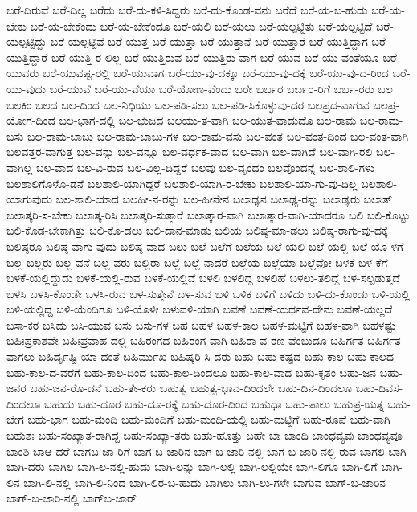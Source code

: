 ಬರೆ-ದಿರುವೆ
ಬರೆ-ದಿಲ್ಲ
ಬರೆದು
ಬರೆ-ದು-ಕಳಿ-ಸಿದ್ದರು
ಬರೆ-ದು-ಕೊಂಡ-ವನು
ಬರೆದೆ
ಬರೆ-ಯ-ಬ-ಹುದು
ಬರೆ-ಯ-ಬೇಕು
ಬರೆ-ಯ-ಬೇಕೆಂದು
ಬರೆ-ಯ-ಬೇಕೆಂದೂ
ಬರೆ-ಯಲಿ
ಬರೆ-ಯಲು
ಬರೆ-ಯಲ್ಪಟ್ಟಿತು
ಬರೆ-ಯಲ್ಪಟ್ಟಿದೆ
ಬರೆ-ಯಲ್ಪಟ್ಟಿದ್ದು
ಬರೆ-ಯಲ್ಪಟ್ಟಿವೆ
ಬರೆ-ಯುತ್ತ
ಬರೆ-ಯುತ್ತಾ
ಬರೆ-ಯುತ್ತಾನೆ
ಬರೆ-ಯುತ್ತಾರೆ
ಬರೆ-ಯುತ್ತಿದ್ದಾಗ
ಬರೆ-ಯುತ್ತಿದ್ದಾರೆ
ಬರೆ-ಯುತ್ತಿ-ರ-ಲಿಲ್ಲ
ಬರೆ-ಯುತ್ತಿರುವ
ಬರೆ-ಯುತ್ತಿರು-ವಾಗ
ಬರೆ-ಯುವ
ಬರೆ-ಯು-ವಂತೆಯೂ
ಬರೆ-ಯುವರು
ಬರೆ-ಯುವಷ್ಟ-ರಲ್ಲಿ
ಬರೆ-ಯುವಾಗ
ಬರೆ-ಯು-ವು-ದಕ್ಕೂ
ಬರೆ-ಯು-ವು-ದಕ್ಕೆ
ಬರೆ-ಯು-ವು-ದ-ರಿಂದ
ಬರೆ-ಯು-ವುದು
ಬರೆ-ಯುವೆ
ಬರೆ-ಯು-ವೆಯಾ
ಬರೆ-ಯೋಣ-ವೆಂದು
ಬರೇ
ಬರ್ಬರ
ಬರ್ಬರ-ರಿಗೆ
ಬರ್ಬ-ರರು
ಬಲ
ಬಲಕಿಂ
ಬಲದ
ಬಲ-ದಿಂದ
ಬಲ-ನಿಧಿಯು
ಬಲ-ಪಡಿ-ಸಲು
ಬಲ-ಪಡಿ-ಸಿಕೊಳ್ಳುವು-ದರ
ಬಲಪ್ರದ-ವಾಗುವ
ಬಲಪ್ರ-ಯೋಗ-ದಿಂದ
ಬಲ-ಭಾಗ-ದಲ್ಲಿ
ಬಲ-ಭುಜದ
ಬಲಯು-ತ-ವಾಗಿ
ಬಲ-ಯುತ-ವಾದುದೊ
ಬಲ-ರಾಮ
ಬಲ-ರಾಮ-ಬಸು
ಬಲ-ರಾಮ-ಬಾಬು
ಬಲ-ರಾಮ-ಬಾಬು-ಗಳ
ಬಲ-ರಾಮ-ವಸು
ಬಲ-ವಂತ
ಬಲ-ವಂತ-ದಿಂದ
ಬಲ-ವಂತ-ವಾಗಿ
ಬಲವತ್ತರ-ವಾಗುತ್ತ
ಬಲ-ವನ್ನು
ಬಲ-ವನ್ನೂ
ಬಲ-ವರ್ಧಕ-ವಾದ
ಬಲ-ವಾಗಿ
ಬಲ-ವಾಗಿದೆ
ಬಲ-ವಾಗಿ-ರಲಿ
ಬಲ-ವಾಗಿಲ್ಲ
ಬಲ-ವಾದ
ಬಲ-ವಿ-ರುವ
ಬಲ-ವಿಲ್ಲ-ದಿದ್ದರೆ
ಬಲವು
ಬಲ-ವೃಂದಂ
ಬಲವೊಂದನ್ನೆ
ಬಲ-ಶಾಲಿ-ಗಳು
ಬಲಶಾಲಿಗೊಳೊ-ಡನೆ
ಬಲಶಾಲಿ-ಯಾಗಿದ್ದರೆ
ಬಲಶಾಲಿ-ಯಾಗಿ-ರ-ಬೇಕು
ಬಲಶಾಲಿ-ಯಾ-ಗು-ವು-ದಿಲ್ಲ
ಬಲಶಾಲಿ-ಯಾಗುವುದು
ಬಲ-ಶಾಲಿ-ಯಾದ
ಬಲಹೀ-ನ-ರನ್ನು
ಬಲ-ಹೀನೇನ
ಬಲಾಢ್ಯನ
ಬಲಾಢ್ಯ-ರನ್ನು
ಬಲಾಢ್ಯರು
ಬಲಾತ್
ಬಲಾತ್ಕರಿ-ಸ-ಬೇಕು
ಬಲಾತ್ಕ-ರಿಸಿ
ಬಲಾತ್ಕರಿ-ಸುತ್ತಾರೆ
ಬಲಾತ್ಕಾರ-ವಾಗಿ
ಬಲಾತ್ಕಾರ-ವಾಗಿ-ಯಾದರೂ
ಬಲಿ
ಬಲಿ-ಕೊಟ್ಟು
ಬಲಿ-ಕೊಡ-ಬೇಕಾಗಿತ್ತು
ಬಲಿ-ಕೊ-ಡಲು
ಬಲಿ-ದಾನ-ಮಾಡು
ಬಲಿಯ
ಬಲಿಷ್ಠ-ಮಾ-ಡಲು
ಬಲಿಷ್ಠ-ರಾಗು-ವು-ದಕ್ಕೆ
ಬಲಿಷ್ಠರೂ
ಬಲಿಷ್ಠ-ವಾಗು-ವುದು
ಬಲಿಷ್ಠ-ವಾದ
ಬಲು
ಬಲೆ
ಬಲೆಗೆ
ಬಲೆಯ
ಬಲೆ-ಯಲಿ
ಬಲೆ-ಯಲ್ಲಿ
ಬಲೆ-ಯೊ-ಳಗೆ
ಬಲ್ಲ
ಬಲ್ಲರು
ಬಲ್ಲ-ವನೆ
ಬಲ್ಲ-ವರು
ಬಲ್ಲಿರಾ
ಬಲ್ಲೆ
ಬಲ್ಲೆ-ನಾದರೆ
ಬಲ್ಲೆಯ
ಬಲ್ಲೆಯಾ
ಬಲ್ಲೆವೋ
ಬಳಕೆ
ಬಳ-ಕೆಗೆ
ಬಳಕೆ-ಯಲ್ಲಿದ್ದುದು
ಬಳಕೆ-ಯಲ್ಲಿ-ರುವ
ಬಳಕೆ-ಯಲ್ಲಿವೆ
ಬಳಲಿ
ಬಳಲಿದ್ದ
ಬಳಲಿಹೆ
ಬಳಲು-ತಲಿದ್ದೆ
ಬಳ-ಸಲ್ಪಡುತ್ತದೆ
ಬಳಸಿ
ಬಳಸಿ-ಕೊಂಡೇ
ಬಳಸಿ-ರುವ
ಬಳ-ಸುತ್ತೇನೆ
ಬಳ-ಸುವ
ಬಳಿ
ಬಳಿಕ
ಬಳಿಗೆ
ಬಳಿದು
ಬಳಿ-ದು-ಕೊಂಡು
ಬಳಿ-ಯಲ್ಲಿ
ಬಳಿ-ಯಲ್ಲಿದ್ದ
ಬಳಿ-ಯೆಂದಿಗೂ
ಬಳಿ-ಯೊಳೀ
ಬಳುವಳಿ-ಯಾಗಿ
ಬವಣೆ
ಬವಣೆ-ಯರ್ಥವ-ದೇನು
ಬವಣೆ-ಯಲ್ಲದೆ
ಬಸಾ-ಕರ
ಬಸಿದು
ಬಸಿ-ಯುವ
ಬಸು
ಬಸು-ಗಳ
ಬಹ
ಬಹಳ
ಬಹಳ-ಕಾಲ
ಬಹಳ-ಮಟ್ಟಿಗೆ
ಬಹಳ-ವಾಗಿ
ಬಹಳಷ್ಟು
ಬಹಿಃಪ್ರಕಾಶವೇ
ಬಹಿಃಪ್ರವಾಹ-ದಲ್ಲಿ
ಬಹಿರಂಗದ
ಬಹಿರಂಗ-ವಾಗಿ
ಬಹಿರಾ-ವ-ರಣ-ವೆಂಬುದೂ
ಬಹಿರ್ಗತ
ಬಹಿರ್ಗತ-ವಾಗಲು
ಬಹಿರ್ದೃಷ್ಟಿ-ಯಾ-ದಂತೆ
ಬಹಿರ್ಮುಖ
ಬಹಿಷ್ಕರಿ-ಸಿ-ದರು
ಬಹು
ಬಹು-ಕಷ್ಟದ
ಬಹು-ಕಾಲ
ಬಹು-ಕಾಲದ
ಬಹು-ಕಾಲ-ದ-ವರೆಗೆ
ಬಹು-ಕಾಲ-ದಿಂದ
ಬಹು-ಕಾಲ-ದಿಂದಲೂ
ಬಹು-ಕಾಲ-ವಾದ
ಬಹು-ಕೃತಂ
ಬಹು-ಜನ
ಬಹು-ಜನರ
ಬಹು-ಜನ-ರೊ-ಡನೆ
ಬಹು-ತೇ-ಕರು
ಬಹುತ್ವ
ಬಹುತ್ವ-ಭಾವ-ದಿಂದಲೇ
ಬಹು-ದಿನ-ದಿಂದಲೂ
ಬಹು-ದಿವಸ-ದಿಂದಲೂ
ಬಹುದು
ಬಹು-ದೂರ
ಬಹು-ದೂ-ರಕ್ಕೆ
ಬಹು-ದೂರ-ದಿಂದ
ಬಹುಧಾ
ಬಹು-ಪಾಲು
ಬಹುಪ್ರ-ಯತ್ನ
ಬಹು-ಬೇಗ
ಬಹು-ಭಾಗ
ಬಹು-ಮಂದಿ
ಬಹು-ಮಂದಿಗೆ
ಬಹು-ಮಂದಿ-ಯಲ್ಲಿ
ಬಹು-ಮಟ್ಟಿಗೆ
ಬಹು-ರೂಪೆ
ಬಹು-ವಾಗಿ
ಬಹುಶಃ
ಬಹು-ಸಂಖ್ಯಾತ-ರಾಗಿದ್ದ
ಬಹು-ಸಂಖ್ಯಾ-ತರು
ಬಹು-ಹೊತ್ತು
ಬಹೇ
ಬಾ
ಬಾಂದಿ
ಬಾಂಧವ್ಯವು
ಬಾಂಧವ್ಯವೂ
ಬಾಂಶಿ
ಬಾಆ-ದರೆ
ಬಾಗಬ-ಜಾ-ರಿಗೆ
ಬಾಗ-ಬ-ಜಾರಿನ
ಬಾಗ-ಬ-ಜಾರಿ-ನಲ್ಲಿ
ಬಾಗ-ಬ-ಜಾರಿ-ನಲ್ಲಿ-ರುವ
ಬಾಗಲಿ
ಬಾಗಿ
ಬಾಗಿ-ದರು
ಬಾಗಿಲ
ಬಾಗಿ-ಲ-ನಲ್ಲಿ-ಹುದು
ಬಾಗಿ-ಲನ್ನು
ಬಾಗಿ-ಲಲ್ಲಿ
ಬಾಗಿ-ಲಲ್ಲಿಯೇ
ಬಾಗಿ-ಲಿಗೂ
ಬಾಗಿ-ಲಿಗೆ
ಬಾಗಿ-ಲಿನ
ಬಾಗಿ-ಲಿ-ನಲ್ಲಿ
ಬಾಗಿ-ಲಿ-ನಿಂದ
ಬಾಗಿ-ಲಿರ-ಬ-ಹುದು
ಬಾಗಿಲು
ಬಾಗಿ-ಲು-ಗಳೇ
ಬಾಗುವ
ಬಾಗ್‌-ಬ-ಜಾರಿನ
ಬಾಗ್‌-ಬ-ಜಾರಿ-ನಲ್ಲಿ
ಬಾಗ್‌ಬ-ಜಾರ್
